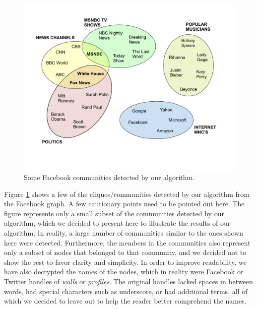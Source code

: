 \begin{figure}%
  \centering
    \includegraphics[scale=0.5]{communities_fb.pdf}
    
  \caption{Some Facebook communities detected by our algorithm.}
\label{fig-communities-fb}
\end{figure}

Figure \ref{fig-communities-fb} shows a few of the cliques/communities detected by our algorithm from the Facebook graph. A few cautionary points need to be pointed out here. The figure represents only a small subset of the communities detected by our algorithm, which we decided to present here to illustrate the results of our algorithm. In reality, a large number of communities similar to the ones shown here were detected. Furthermore, the members in the communities also represent only a subset of nodes that belonged to that community, and we decided not to show the rest to favor clarity and simplicity. In order to improve readability, we have also decrypted the names of the nodes, which in reality were Facebook or Twitter handles of {\it walls} or {\it profiles}. The original handles lacked spaces in between words, had special characters such as underscore, or had additional terms, all of which we decided to leave out to help the reader better comprehend the names.

